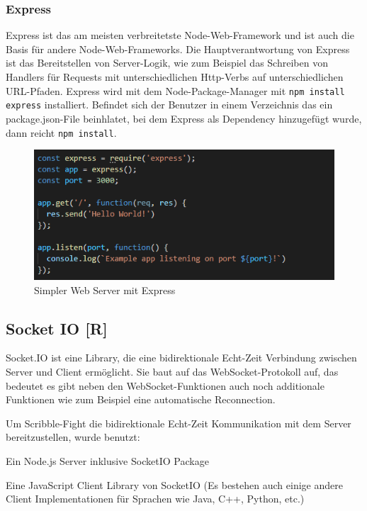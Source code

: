 \subsubsection{Express}
Express ist das am meisten verbreitetste Node-Web-Framework und ist auch die Basis für andere Node-Web-Frameworks. Die Hauptverantwortung
von Express ist das Bereitstellen von Server-Logik, wie zum Beispiel das Schreiben von Handlers für Requests mit unterschiedlichen Http-Verbs auf unterschiedlichen URL-Pfaden.
Express wird mit dem Node-Package-Manager mit \texttt{npm install express} installiert. Befindet sich der Benutzer in
einem Verzeichnis das ein package.json-File beinhlatet, bei dem Express als Dependency hinzugefügt wurde, dann reicht \texttt{npm install}.

\begin{figure}[H]
    \centering
    \includegraphics[scale=1]{pics/Express.PNG}
    \caption{Simpler Web Server mit Express}
\end{figure}

\subsection{Socket IO [R]}

Socket.IO ist eine Library, die eine bidirektionale Echt-Zeit Verbindung zwischen Server und Client ermöglicht. Sie baut auf das WebSocket-Protokoll auf, das bedeutet es gibt neben den WebSocket-Funktionen auch noch additionale Funktionen wie zum Beispiel eine automatische Reconnection.

Um Scribble-Fight die bidirektionale Echt-Zeit Kommunikation mit dem Server bereitzustellen, wurde benutzt:
\begin{compactitem}
    \item Ein Node.js Server inklusive SocketIO Package
    \item Eine JavaScript Client Library von SocketIO (Es bestehen auch einige andere Client Implementationen für Sprachen wie Java, C++, Python, etc.)
\end{compactitem}

